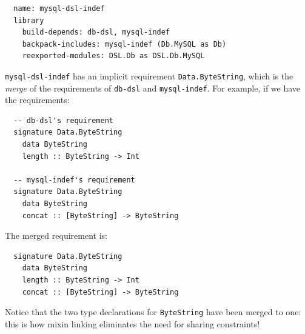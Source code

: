 \begin{verbatim}
  name: mysql-dsl-indef
  library
    build-depends: db-dsl, mysql-indef
    backpack-includes: mysql-indef (Db.MySQL as Db)
    reexported-modules: DSL.Db as DSL.Db.MySQL
\end{verbatim}
%
\verb|mysql-dsl-indef| has an implicit requirement
\verb|Data.ByteString|, which is the \emph{merge} of the
requirements of \verb|db-dsl| and \verb|mysql-indef|.  For
example, if we have the requirements:

\begin{verbatim}
  -- db-dsl's requirement
  signature Data.ByteString
    data ByteString
    length :: ByteString -> Int

  -- mysql-indef's requirement
  signature Data.ByteString
    data ByteString
    concat :: [ByteString] -> ByteString
\end{verbatim}
%
The merged requirement is:

\begin{verbatim}
  signature Data.ByteString
    data ByteString
    length :: ByteString -> Int
    concat :: [ByteString] -> ByteString
\end{verbatim}
%
Notice that the two type declarations for \verb|ByteString| have been
merged to one: this is how mixin linking eliminates the need
for sharing constraints!
